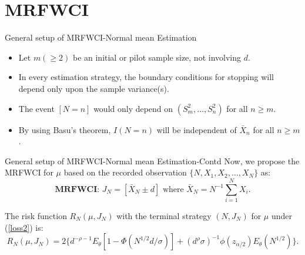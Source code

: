 \documentclass [xcolor=svgnames, t] {beamer}
\begin{document}
\section{MRFWCI}
\begin{frame}{General setup of MRFWCI-Normal mean Estimation}
\vspace{5mm}
\begin{itemize}
\item Let $m(\geq 2)$ be an initial or pilot sample size, not involving $d$.
\item In every estimation strategy, the boundary 
conditions for stopping will depend only upon the sample variance(s).
\item The event $[N=n]$  would only depend on $(S_m^2,\dots,S_n^2)$ for all $n \geq m$.
\item By using Basu's theorem, $I(N=n)$ will be independent of $\bar{X}_n$ for all $n \geq m$.
\end{itemize}

\end{frame}

\begin{frame}{General setup of MRFWCI-Normal mean Estimation-Contd}
\vspace{5mm}
Now, we propose the MRFWCI for $\mu$ based on the recorded observation $\{N,X_1,X_2,\dots ,X_N\}$ as:
    \begin{equation*}
    \textbf{MRFWCI: }J_N=[\bar{X}_N \pm d] \text{ where }\bar{X}_N=N^{-1} \sum_{i=1}^N{X_i}.    
    \end{equation*}
    
    The risk function $R_N(\mu,J_N)$ with the terminal strategy $(N,J_N)$ for $\mu$ under (\ref{loss2}) is:
    \begin{equation*}
        R_N(\mu,J_N) = 2\{ d^{-\rho-1} E_{\theta}[1-\Phi(N^{1/2}d/\sigma)]+ (d^{\rho}\sigma)^{-1}\phi(z_{\alpha/2})E_{\theta}(N^{1/2})\}.
    \end{equation*}
    
    
\end{frame}

\end{document}
